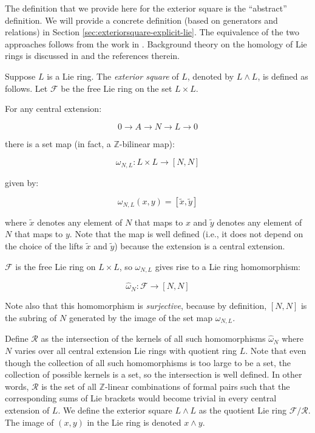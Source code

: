 \documentclass{ucetd}
\begin{document}
The definition that we provide here for the exterior square is the
``abstract'' definition. We will provide a concrete definition (based
on generators and relations) in Section
\ref{sec:exteriorsquare-explicit-lie}. The equivalence of the two
approaches follows from the work in \cite{EllisLie}. Background theory
on the homology of Lie rings is discussed in
\cite{SchurmultiplierandLazard} and the references therein.

Suppose $L$ is a Lie ring. The {\em exterior square} of $L$, denoted by
$L \wedge L$, is defined as follows. Let $\mathcal{F}$ be the free
Lie ring on the set $L \times L$. 

For any central extension:

$$0 \to A \to N \to L \to 0$$

there is a set map (in fact, a $\mathbb{Z}$-bilinear map):

$$\omega_{N,L}: L \times L \to [N,N]$$

given by:

$$\omega_{N,L}(x,y) = [\tilde{x},\tilde{y}]$$

where $\tilde{x}$ denotes any element of $N$ that maps to $x$ and
$\tilde{y}$ denotes any element of $N$ that maps to $y$. Note that the
map is well defined (i.e., it does not depend on the choice of the
lifts $\tilde{x}$ and $\tilde{y}$) because the extension is a central
extension.

$\mathcal{F}$ is the free Lie ring on $L \times L$, so $\omega_{N,L}$
gives rise to a Lie ring homomorphism:

$$\hat{\omega}_N:\mathcal{F} \to [N,N]$$

Note also that this homomorphism is {\em surjective}, because by
definition, $[N,N]$ is the subring of $N$ generated by the image of the
set map $\omega_{N,L}$.

Define $\mathcal{R}$ as the intersection of the kernels of all such
homomorphisms $\hat{\omega}_N$ where $N$ varies over all central
extension Lie rings with quotient ring $L$. Note that even though the
collection of all such homomorphisms is too large to be a set, the
collection of possible kernels is a set, so the intersection is well
defined. In other words, $\mathcal{R}$ is the set of all
$\mathbb{Z}$-linear combinations of formal pairs such that the
corresponding sums of Lie brackets would become trivial in every
central extension of $L$. We define the exterior square $L \wedge L$
as the quotient Lie ring $\mathcal{F}/\mathcal{R}$. The image of $(x,y)$
in the Lie ring is denoted $x \wedge y$.
\end{document}
